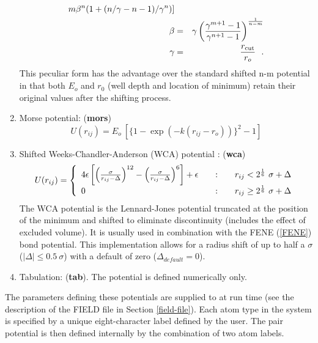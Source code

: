 \begin{enumerate}
\begin{eqnarray}
{m\beta^{n}(1+(n/\gamma-n-1)/\gamma^{n})]} \nonumber \\
\beta &=& \gamma\left( \frac{\gamma^{m+1}-1}{\gamma^{n+1}-1}
\right)^{\frac{1}{n-m}} \\
\gamma &=& \frac{r_{\rm cut}}{r_{o}}~~. \nonumber
\end{eqnarray}
This peculiar form has the advantage over the standard shifted n-m
potential in that both $E_{o}$ and $r_{0}$ (well depth and location of
minimum) retain their original values after the shifting process.
\item Morse potential:  ({\bf mors})
\begin{equation}
U(r_{ij}) = E_{o}~[\{1-\exp(-k(r_{ij}-r_{o}))\}^{2}-1]
\end{equation}
\item Shifted Weeks-Chandler-Anderson (WCA) potential \cite{weeks-71a}:  ({\bf wca})
\begin{equation}
U(r_{ij}) = \left\{ \begin{array} {l@{\qquad:\qquad}l}
4\epsilon\left[\left(\frac{\sigma}{r_{ij}-\Delta}\right)^{12}-\left(\frac{\sigma}{r_{ij}-\Delta}\right)^{6}\right]
+\epsilon & r_{ij} < 2^{1 \over 6}~\sigma + \Delta \\
0 & r_{ij} \ge 2^{1 \over 6}~\sigma + \Delta \end{array} \right. \label{wca}
\end{equation}
The WCA potential is the Lennard-Jones potential truncated at the
position of the minimum and shifted to eliminate discontinuity
(includes the effect of excluded volume).  It is usually used in
combination with the FENE (\ref{FENE}) bond potential.  This
implementation allows for a radius shift of up to half a $\sigma$
($|\Delta| \le 0.5~\sigma$) with a default of zero
($\Delta_{default} = 0$).
\item Tabulation:  ({\bf tab}).  The potential is defined
numerically only.
\end{enumerate}

The parameters defining these potentials are supplied to \D at run
time (see the description of the FIELD file in Section
\ref{field-file}).  Each atom type in the system is specified by a
unique eight-character label defined by the user.  The pair
potential is then defined internally by the combination of two
atom labels.


